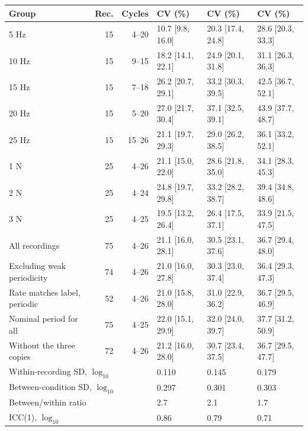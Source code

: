 \begin{tabular}{lrrlll}
\toprule
Group & Rec. & Cycles & CV \RMS{} (\%) & CV \Vpp{} (\%) & CV \Vmax{} (\%) \\
\midrule
5 Hz & 15 & 4--20 & 10.7 [9.8, 16.0] & 20.3 [17.4, 24.8] & 28.6 [20.3, 33.3] \\
10 Hz & 15 & 9--15 & 18.2 [14.1, 22.1] & 24.9 [20.1, 31.8] & 31.1 [26.3, 36.3] \\
15 Hz & 15 & 7--18 & 26.2 [20.7, 29.1] & 33.2 [30.3, 39.5] & 42.5 [36.7, 52.1] \\
20 Hz & 15 & 5--20 & 27.0 [21.7, 30.4] & 37.1 [32.5, 39.1] & 43.9 [37.7, 48.7] \\
25 Hz & 15 & 15--26 & 21.1 [19.7, 29.3] & 29.0 [26.2, 38.5] & 36.1 [33.2, 52.1] \\
\midrule
1 N & 25 & 4--26 & 21.1 [15.0, 22.0] & 28.6 [21.8, 35.0] & 34.1 [28.3, 45.3] \\
2 N & 25 & 4--24 & 24.8 [19.7, 29.8] & 33.2 [28.2, 38.7] & 39.4 [34.8, 48.6] \\
3 N & 25 & 4--25 & 19.5 [13.2, 26.4] & 26.4 [17.5, 37.1] & 33.9 [21.5, 47.5] \\
\midrule
All recordings & 75 & 4--26 & 21.1 [16.0, 28.1] & 30.5 [23.1, 37.6] & 36.7 [29.4, 48.0] \\
Excluding weak periodicity & 74 & 4--26 & 21.0 [16.0, 27.8] & 30.3 [23.0, 37.4] & 36.4 [29.3, 47.3] \\
Rate matches label, periodic & 52 & 4--26 & 21.0 [15.8, 28.0] & 31.0 [22.9, 36.2] & 36.7 [29.5, 46.9] \\
Nominal period for all & 75 & 4--25 & 22.0 [15.1, 29.9] & 32.0 [24.0, 39.7] & 37.7 [31.2, 50.9] \\
Without the three copies & 72 & 4--26 & 21.2 [16.0, 28.0] & 30.7 [23.4, 37.5] & 36.7 [29.5, 47.7] \\
\midrule
\multicolumn{3}{l}{Within-recording SD, $\log_{10}$} & 0.110 & 0.145 & 0.179 \\
\multicolumn{3}{l}{Between-condition SD, $\log_{10}$} & 0.297 & 0.301 & 0.303 \\
\multicolumn{3}{l}{Between/within ratio} & 2.7 & 2.1 & 1.7 \\
\multicolumn{3}{l}{ICC(1), $\log_{10}$} & 0.86 & 0.79 & 0.71 \\
\bottomrule
\end{tabular}

